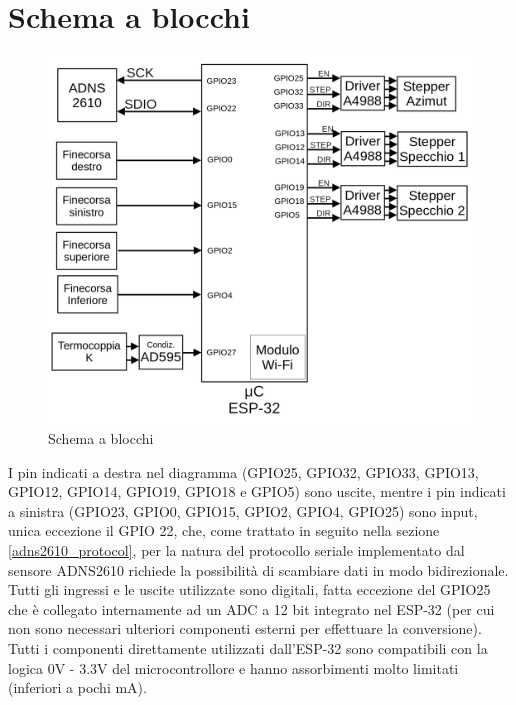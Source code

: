 \documentclass[12pt]{article}
\begin{document}
    \vfill


\section{Schema a blocchi}

\begin{figure}[h]
\centering
    \includegraphics[width=\textwidth-30pt]{Draws/Block_diagram.png}
    \caption{Schema a blocchi}
\end{figure}

I pin indicati a destra nel diagramma (GPIO25, GPIO32, GPIO33, GPIO13, GPIO12, GPIO14, GPIO19, GPIO18 e GPIO5) sono uscite, mentre i pin indicati a sinistra (GPIO23, GPIO0, GPIO15, GPIO2, GPIO4, GPIO25) sono input, unica eccezione il GPIO 22, che, come trattato in seguito nella sezione \ref{adns2610_protocol}, per la natura del protocollo seriale implementato dal sensore ADNS2610 richiede la possibilità di scambiare dati in modo bidirezionale. Tutti gli ingressi e le uscite utilizzate sono digitali, fatta eccezione del GPIO25 che è collegato internamente ad un ADC a 12 bit integrato nel ESP-32 (per cui non sono necessari ulteriori componenti esterni per effettuare la conversione).\\
Tutti i componenti direttamente utilizzati dall'ESP-32 sono compatibili con la logica 0V - 3.3V del microcontrollore e hanno assorbimenti molto limitati (inferiori a pochi mA).\\
\end{document}
